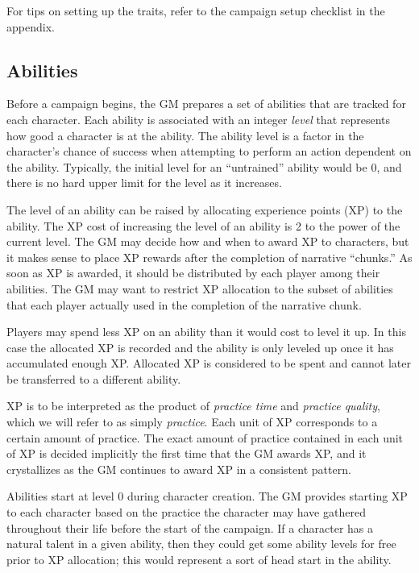 For tips on setting up the traits, refer to the campaign setup checklist in the appendix.

\subsection{Abilities}
Before a campaign begins, the GM prepares a set of abilities that are tracked for each character.
Each ability is associated with an integer \emph{level} that represents how good a character is at the ability.
The ability level is a factor in the character’s chance of success when attempting to perform an action dependent on the ability.
Typically, the initial level for an ``untrained'' ability would be $0$, and there is no hard upper limit for the level as it increases.

The level of an ability can be raised by allocating experience points (XP) to the ability.
The XP cost of increasing the level of an ability is 2 to the power of the current level.
The GM may decide how and when to award XP to characters, but it makes sense to place XP rewards after the completion of narrative ``chunks.''
As soon as XP is awarded, it should be distributed by each player among their abilities.
The GM may want to restrict XP allocation to the subset of abilities that each player actually used in the completion of the narrative chunk.

Players may spend less XP on an ability than it would cost to level it up.
In this case the allocated XP is recorded and the ability is only leveled up once it has accumulated enough XP.
Allocated XP is considered to be spent and cannot later be transferred to a different ability.

XP is to be interpreted as the product of \emph{practice time} and \emph{practice quality}, which we will refer to as simply \emph{practice}.
Each unit of XP corresponds to a certain amount of practice.
The exact amount of practice contained in each unit of XP is decided implicitly the first time that the GM awards XP,
and it crystallizes as the GM continues to award XP in a consistent pattern.

Abilities start at level 0 during character creation.
The GM provides starting XP to each character based on the practice the character may have gathered throughout their life before the start of the campaign.
If a character has a natural talent in a given ability,
then they could get some ability levels for free prior to XP allocation; this would represent a sort of head start in the ability.

